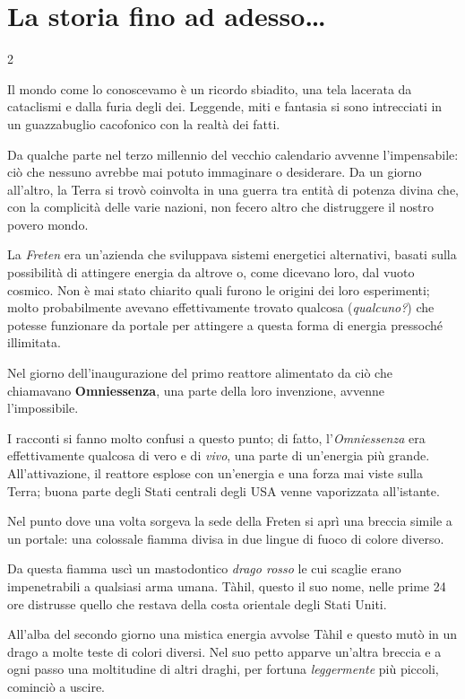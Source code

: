 \section{La storia fino ad adesso…}

\begin{multicols}{2}

Il mondo come lo conoscevamo è un ricordo sbiadito, una tela lacerata da cataclismi e dalla furia degli dei. Leggende, miti e fantasia si sono intrecciati in un guazzabuglio cacofonico con la realtà dei fatti.

Da qualche parte nel terzo millennio del vecchio calendario avvenne l'impensabile: ciò che nessuno avrebbe mai potuto immaginare o desiderare. Da un giorno all'altro, la Terra si trovò coinvolta in una guerra tra entità di potenza divina che, con la complicità delle varie nazioni, non fecero altro che distruggere il nostro povero mondo.

La \emph{Freten} era un'azienda che sviluppava sistemi energetici alternativi, basati sulla possibilità di attingere energia da altrove o, come dicevano loro, dal vuoto cosmico.
Non è mai stato chiarito quali furono le origini dei loro esperimenti; molto probabilmente avevano effettivamente trovato qualcosa (\emph{qualcuno?}) che potesse funzionare da portale per attingere a questa forma di energia pressoché illimitata.

Nel giorno dell'inaugurazione del primo reattore alimentato da ciò che chiamavano \textbf{Omniessenza}, una parte della loro invenzione, avvenne l'impossibile.

I racconti si fanno molto confusi a questo punto; di fatto, l'\emph{Omniessenza} era effettivamente qualcosa di vero e di \emph{vivo}, una parte di un'energia più grande. All'attivazione, il reattore esplose con un'energia e una forza mai viste sulla Terra; buona parte degli Stati centrali degli USA venne vaporizzata all'istante.

Nel punto dove una volta sorgeva la sede della Freten si aprì una breccia simile a un portale: una colossale fiamma divisa in due lingue di fuoco di colore diverso.

Da questa fiamma uscì un mastodontico \emph{drago rosso} le cui scaglie erano impenetrabili a qualsiasi arma umana. Tàhil, questo il suo nome, nelle prime 24 ore distrusse quello che restava della costa orientale degli Stati Uniti.

All'alba del secondo giorno una mistica energia avvolse Tàhil e questo mutò in un drago a molte teste di colori diversi. Nel suo petto apparve un'altra breccia e a ogni passo una moltitudine di altri draghi, per fortuna \emph{leggermente} più piccoli, cominciò a uscire.


\end{multicols}
